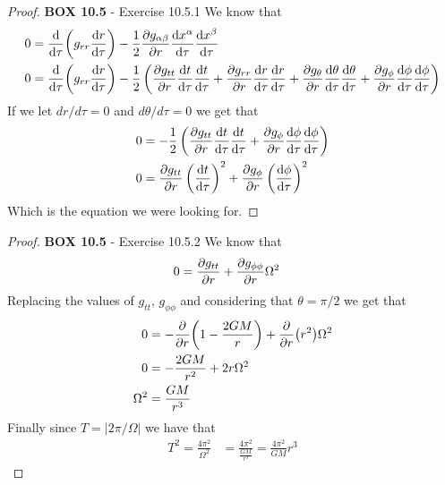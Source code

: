 \documentclass[11pt]{article}
\theoremstyle{definition}
\begin{document}
\cleardoublepage
\begin{proof}{\textbf{BOX 10.5} - Exercise 10.5.1}
    We know that
    \begin{align*}
        0 &= \dv{\tau}(g_{rr}\dv{r}{\tau})
        - \frac{1}{2}\pdv{g_{\alpha\beta}}{r}\dv{x^\alpha}{\tau}\dv{x^\beta}{\tau}\\
        0 &= \dv{\tau}(g_{rr}\dv{r}{\tau}) - \frac{1}{2}\left(
            \pdv{g_{tt}}{r}\dv{t}{\tau}\dv{t}{\tau}
            + \pdv{g_{rr}}{r}\dv{r}{\tau}\dv{r}{\tau}
            + \pdv{g_{\theta}}{r}\dv{\theta}{\tau}\dv{\theta}{\tau}
            + \pdv{g_{\phi}}{r}\dv{\phi}{\tau}\dv{\phi}{\tau}
        \right)
    \end{align*}
    If we let $dr/d\tau = 0$ and $d\theta/d\tau = 0$ we get that
    \begin{align*}
        0 &= - \frac{1}{2}\left(
            \pdv{g_{tt}}{r}\dv{t}{\tau}\dv{t}{\tau}
            + \pdv{g_{\phi}}{r}\dv{\phi}{\tau}\dv{\phi}{\tau}
        \right)\\
        0 &= \pdv{g_{tt}}{r}\left(\dv{t}{\tau}\right)^2
        + \pdv{g_{\phi}}{r}\left(\dv{\phi}{\tau}\right)^2
    \end{align*}
    Which is the equation we were looking for.
\end{proof}
\begin{proof}{\textbf{BOX 10.5} - Exercise 10.5.2}
    We know that 
    \begin{align*}
        0 &= \pdv{g_{tt}}{r} + \pdv{g_{\phi\phi}}{r}\Omega^2
    \end{align*}
    Replacing the values of $g_{tt}$, $g_{\phi\phi}$ and considering
    that $\theta =\pi/2$ we get that
    \begin{align*}
        0 &= -\pdv{r}(1-\frac{2GM}{r}) + \pdv{r}(r^2)\Omega^2\\
        0 &= -\frac{2GM}{r^2} + 2r\Omega^2\\
        \Omega^2 &= \frac{GM}{r^3}
    \end{align*}
    Finally since $T = |2\pi/\Omega|$ we have that
    \begin{align*}
        T^2 = \frac{4\pi^2}{\Omega^2} &= \frac{4\pi^2}{\frac{GM}{r^3}}
        = \frac{4\pi^2}{GM}r^3
    \end{align*}
\end{proof}
\cleardoublepage
\end{document}
